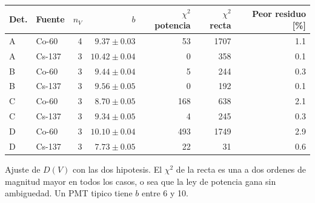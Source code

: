 \begin{tabular}{llrrrrr}
\toprule
\textbf{Det.} & \textbf{Fuente} & \textbf{$n_V$} & \textbf{$b$} & \textbf{$\chi^2$ potencia} & \textbf{$\chi^2$ recta} & \textbf{Peor residuo [\%]} \\
\midrule
A & Co-60 & 4 & $9.37 \pm 0.03$ & 53 & 1707 & 1.1 \\
A & Cs-137 & 3 & $10.42 \pm 0.04$ & 0 & 358 & 0.1 \\
B & Co-60 & 3 & $9.44 \pm 0.04$ & 5 & 244 & 0.3 \\
B & Cs-137 & 3 & $9.56 \pm 0.05$ & 0 & 192 & 0.1 \\
C & Co-60 & 3 & $8.70 \pm 0.05$ & 168 & 638 & 2.1 \\
C & Cs-137 & 3 & $9.34 \pm 0.05$ & 4 & 245 & 0.3 \\
D & Co-60 & 3 & $10.10 \pm 0.04$ & 493 & 1749 & 2.9 \\
D & Cs-137 & 3 & $7.73 \pm 0.05$ & 22 & 31 & 0.6 \\
\bottomrule
\end{tabular}
\par\smallskip
\begin{minipage}{0.95\linewidth}\footnotesize Ajuste de $D(V)$ con las dos hipotesis. El $\chi^2$ de la recta es una a dos ordenes de magnitud mayor en todos los casos, o sea que la ley de potencia gana sin ambiguedad. Un PMT tipico tiene $b$ entre 6 y 10.\end{minipage}
